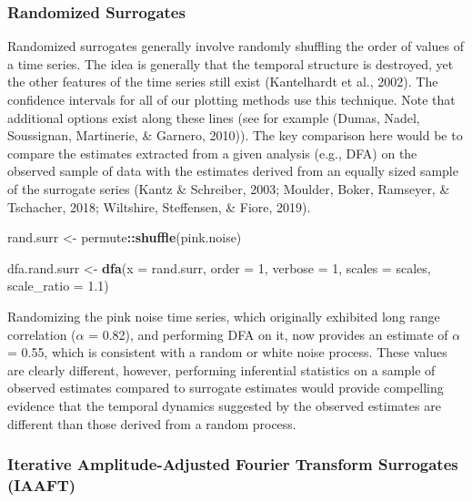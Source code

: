 \documentclass[
  man]{apa6}
\newenvironment{Shaded}{\begin{snugshade}}{\end{snugshade}}
\newcommand{\AttributeTok}[1]{\textcolor[rgb]{0.13,0.29,0.53}{#1}}
\newcommand{\DecValTok}[1]{\textcolor[rgb]{0.00,0.00,0.81}{#1}}
\newcommand{\FloatTok}[1]{\textcolor[rgb]{0.00,0.00,0.81}{#1}}
\newcommand{\FunctionTok}[1]{\textcolor[rgb]{0.13,0.29,0.53}{\textbf{#1}}}
\newcommand{\NormalTok}[1]{#1}
\newcommand{\OtherTok}[1]{\textcolor[rgb]{0.56,0.35,0.01}{#1}}
\newcommand{\SpecialCharTok}[1]{\textcolor[rgb]{0.81,0.36,0.00}{\textbf{#1}}}
\begin{document}
\hypertarget{randomized-surrogates}{%
\subsubsection{Randomized Surrogates}\label{randomized-surrogates}}

Randomized surrogates generally involve randomly shuffling the order of
values of a time series. The idea is generally that the temporal
structure is destroyed, yet the other features of the time series still
exist (Kantelhardt et al., 2002). The confidence
intervals for all of our plotting methods use this technique. Note that
additional options exist along these lines (see for example
(Dumas, Nadel, Soussignan, Martinerie, \& Garnero, 2010)). The key comparison here
would be to compare the estimates extracted from a given analysis (e.g.,
DFA) on the observed sample of data with the estimates derived from an
equally sized sample of the surrogate series (Kantz \& Schreiber, 2003; Moulder, Boker, Ramseyer, \& Tschacher, 2018; Wiltshire, Steffensen, \& Fiore, 2019).

\begin{Shaded}
\begin{Highlighting}[]
\NormalTok{rand.surr }\OtherTok{\textless{}{-}}\NormalTok{ permute}\SpecialCharTok{::}\FunctionTok{shuffle}\NormalTok{(pink.noise)}

\NormalTok{dfa.rand.surr }\OtherTok{\textless{}{-}} \FunctionTok{dfa}\NormalTok{(}\AttributeTok{x =}\NormalTok{ rand.surr, }\AttributeTok{order =} \DecValTok{1}\NormalTok{, }\AttributeTok{verbose =} \DecValTok{1}\NormalTok{,}
\AttributeTok{scales =}\NormalTok{ scales, }\AttributeTok{scale\_ratio =} \FloatTok{1.1}\NormalTok{)}
\end{Highlighting}
\end{Shaded}

Randomizing the pink noise time series, which originally exhibited long
range correlation (\(\alpha\) = 0.82), and performing DFA on
it, now provides an estimate of \(\alpha\) = 0.55,
which is consistent with a random or white noise process. These values
are clearly different, however, performing inferential statistics on a
sample of observed estimates compared to surrogate estimates would
provide compelling evidence that the temporal dynamics suggested by the
observed estimates are different than those derived from a random
process.

\hypertarget{iterative-amplitude-adjusted-fourier-transform-surrogates-iaaft}{%
\subsubsection{Iterative Amplitude-Adjusted Fourier Transform Surrogates (IAAFT)}\label{iterative-amplitude-adjusted-fourier-transform-surrogates-iaaft}}
\end{document}
